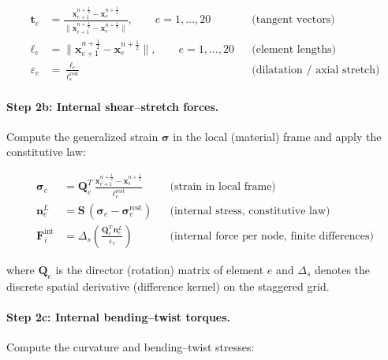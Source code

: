 \documentclass[11pt]{article}
\newcommand{\vect}[1]{\mathbf{#1}}
\newcommand{\mat}[1]{\mathbf{#1}}
\begin{document}
\begin{subequations}
\label{eq:geometry}
\begin{align}
  \vect{t}_e &= \frac{\vect{x}_{e+1}^{n+\frac{1}{2}} - \vect{x}_e^{n+\frac{1}{2}}}
    {\|\vect{x}_{e+1}^{n+\frac{1}{2}} - \vect{x}_e^{n+\frac{1}{2}}\|},
    \qquad e = 1, \ldots, 20
    && \text{(tangent vectors)}
  \label{eq:tangent} \\[4pt]
  \ell_e &= \|\vect{x}_{e+1}^{n+\frac{1}{2}} - \vect{x}_e^{n+\frac{1}{2}}\|,
    \qquad e = 1, \ldots, 20
    && \text{(element lengths)}
  \label{eq:lengths} \\[4pt]
  \varepsilon_e &= \frac{\ell_e}{\ell_e^{\text{rest}}}
    && \text{(dilatation / axial stretch)}
  \label{eq:dilatation}
\end{align}
\end{subequations}

\paragraph{Step 2b: Internal shear--stretch forces.}
Compute the generalized strain $\bm{\sigma}$ in the local (material) frame and apply the constitutive law:

\begin{subequations}
\label{eq:shear-stretch}
\begin{align}
  \bm{\sigma}_e &= \mat{Q}_e^T \,\frac{\vect{x}_{e+1}^{n+\frac{1}{2}} - \vect{x}_e^{n+\frac{1}{2}}}{\ell_e^{\text{rest}}}
    && \text{(strain in local frame)}
  \label{eq:strain-local} \\[4pt]
  \vect{n}_e^L &= \mat{S}\,(\bm{\sigma}_e - \bm{\sigma}_e^{\text{rest}})
    && \text{(internal stress, constitutive law)}
  \label{eq:stress-constitutive} \\[4pt]
  \vect{F}_i^{\text{int}} &= \Delta_s\!\left(\frac{\mat{Q}_e^T\,\vect{n}_e^L}{\varepsilon_e}\right)
    && \text{(internal force per node, finite differences)}
  \label{eq:internal-force}
\end{align}
\end{subequations}

\noindent
where $\mat{Q}_e$ is the director (rotation) matrix of element $e$ and $\Delta_s$ denotes the discrete spatial derivative (difference kernel) on the staggered grid.

\paragraph{Step 2c: Internal bending--twist torques.}
Compute the curvature and bending--twist stresses:
\end{document}
